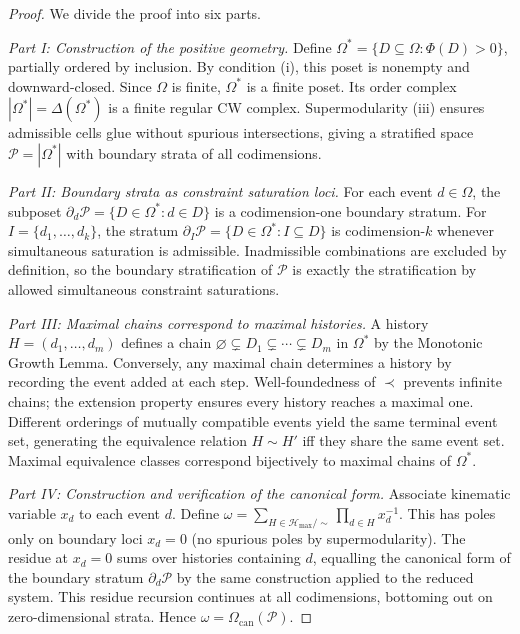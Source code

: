 \documentclass[11pt]{article}
\theoremstyle{plain}
\theoremstyle{definition}
\theoremstyle{remark}
\newcommand{\Phif}{\Phi}
\newcommand{\OmKS}{\Omega}
\newcommand{\CF}{\Omega_{\mathrm{can}}}
\newcommand{\Hmax}{\mathcal{H}_{\max}}
\begin{document}
\begin{proof}
We divide the proof into six parts.

\textit{Part I: Construction of the positive geometry.} Define $\OmKS^* = \{D \subseteq \OmKS : \Phif(D) > 0\}$, partially ordered by inclusion. By condition (i), this poset is nonempty and downward-closed. Since $\OmKS$ is finite, $\OmKS^*$ is a finite poset. Its order complex $|\OmKS^*| = \Delta(\OmKS^*)$ is a finite regular CW complex. Supermodularity (iii) ensures admissible cells glue without spurious intersections, giving a stratified space $\mathcal{P} = |\OmKS^*|$ with boundary strata of all codimensions.

\textit{Part II: Boundary strata as constraint saturation loci.} For each event $d \in \OmKS$, the subposet $\partial_d \mathcal{P} = \{D \in \OmKS^* : d \in D\}$ is a codimension-one boundary stratum. For $I = \{d_1, \ldots, d_k\}$, the stratum $\partial_I \mathcal{P} = \{D \in \OmKS^* : I \subseteq D\}$ is codimension-$k$ whenever simultaneous saturation is admissible. Inadmissible combinations are excluded by definition, so the boundary stratification of $\mathcal{P}$ is exactly the stratification by allowed simultaneous constraint saturations.

\textit{Part III: Maximal chains correspond to maximal histories.} A history $H = (d_1, \ldots, d_m)$ defines a chain $\varnothing \subsetneq D_1 \subsetneq \cdots \subsetneq D_m$ in $\OmKS^*$ by the Monotonic Growth Lemma. Conversely, any maximal chain determines a history by recording the event added at each step. Well-foundedness of $\prec$ prevents infinite chains; the extension property ensures every history reaches a maximal one. Different orderings of mutually compatible events yield the same terminal event set, generating the equivalence relation $H \sim H'$ iff they share the same event set. Maximal equivalence classes correspond bijectively to maximal chains of $\OmKS^*$.

\textit{Part IV: Construction and verification of the canonical form.} Associate kinematic variable $x_d$ to each event $d$. Define $\omega = \sum_{H \in \Hmax/\!\sim} \prod_{d \in H} x_d^{-1}$. This has poles only on boundary loci $x_d = 0$ (no spurious poles by supermodularity). The residue at $x_d = 0$ sums over histories containing $d$, equalling the canonical form of the boundary stratum $\partial_d \mathcal{P}$ by the same construction applied to the reduced system. This residue recursion continues at all codimensions, bottoming out on zero-dimensional strata. Hence $\omega = \CF(\mathcal{P})$.


\end{proof}
\end{document}
